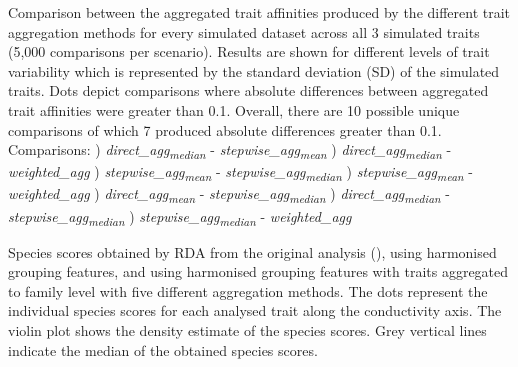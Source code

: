 \documentclass[12pt]{article}
\begin{document}

Comparison between the aggregated trait affinities produced by the different trait aggregation methods for every simulated dataset across all 3 simulated traits (5,000 comparisons per scenario). Results are shown for different levels of trait variability which is represented by the standard deviation (SD) of the simulated traits. Dots depict comparisons where absolute differences between aggregated trait affinities were greater than 0.1. Overall, there are 10 possible unique comparisons of which 7 produced absolute differences greater than 0.1. \newline
  Comparisons: ) \textit{direct\_agg\textsubscript{median}} - \textit{stepwise\_agg\textsubscript{mean}} ) \textit{direct\_agg\textsubscript{median}} - \textit{weighted\_agg} ) \textit{stepwise\_agg\textsubscript{mean}} - \textit{stepwise\_agg\textsubscript{median}} ) \textit{stepwise\_agg\textsubscript{mean}} - \textit{weighted\_agg} ) \textit{direct\_agg\textsubscript{mean}} - \textit{stepwise\_agg\textsubscript{median}} ) \textit{direct\_agg\textsubscript{median}} - \textit{stepwise\_agg\textsubscript{median}} ) \textit{stepwise\_agg\textsubscript{median}} - \textit{weighted\_agg}
\\  


Species scores obtained by RDA from the original analysis (\cite{szocs_effects_2014}), using harmonised grouping features, and using harmonised grouping features with traits aggregated to family level with five different aggregation methods. The dots represent the individual species scores for each analysed trait along the conductivity axis. The violin plot shows the density estimate of the species scores. Grey vertical lines indicate the median of the obtained species scores.
\\

\end{document}
